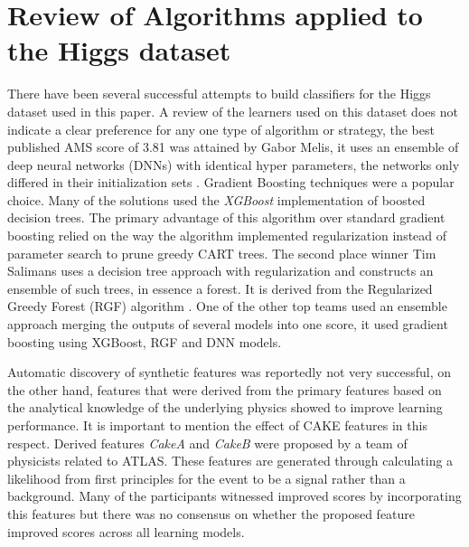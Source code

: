 \documentclass[final,3p,times,twocolumn]{elsarticle}
\begin{document}
\section{Review of Algorithms applied to the Higgs dataset}
\label{lit}
There have been several successful attempts to build classifiers for the Higgs dataset used in this paper. A review of the learners used on this dataset does not indicate a clear preference for any one type of algorithm or strategy, the best published AMS score of 3.81 was attained by Gabor Melis, it uses an ensemble of deep neural networks (DNNs) with identical hyper parameters, the networks only differed in their initialization sets \cite{Gabor}. Gradient Boosting techniques were a popular choice. Many of the solutions used the \textit{XGBoost} implementation of boosted decision trees. The primary advantage of this algorithm over standard gradient boosting relied on the way the algorithm implemented regularization instead of parameter search to prune greedy CART trees.  The second place winner Tim Salimans uses a decision tree approach with regularization and constructs an ensemble of such trees, in essence a \cite{Tim} forest. It is derived from the Regularized Greedy Forest (RGF) algorithm \cite{RGF}. One of the other top teams used an ensemble approach merging the outputs of several models into one score, it used gradient boosting using XGBoost, RGF and DNN models. 

Automatic discovery of synthetic features was reportedly not very successful, on the other hand, features that were derived from the primary features based on the analytical knowledge of the underlying physics showed to improve learning performance. It is important to mention the effect of CAKE features in this respect. Derived features \textit{CakeA} and \textit{CakeB} were proposed by a team of physicists related to ATLAS. These features are generated through calculating a likelihood from first principles for the event to be a signal rather than a background. Many of the participants witnessed improved scores by incorporating this features but there was no consensus on whether the proposed feature improved scores across all learning models. 
\end{document}
